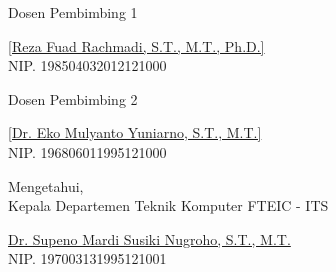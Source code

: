  \begin{center}
  
    \begin{multicols}{2}
  
      Dosen Pembimbing 1
      \vspace{12ex}
  
      \underline{[Reza Fuad Rachmadi, S.T., M.T., Ph.D.]} \\
      NIP. 198504032012121000
  
      \columnbreak
  
      Dosen Pembimbing 2
      \vspace{12ex}
  
      \underline{[Dr. Eko Mulyanto Yuniarno, S.T., M.T.]} \\
      NIP. 196806011995121000
  
    \end{multicols}
    \vspace{6ex}
  
    Mengetahui, \\
    Kepala Departemen Teknik Komputer FTEIC - ITS
    \vspace{12ex}
  
    \underline{Dr. Supeno Mardi Susiki Nugroho, S.T., M.T.} \\
    NIP. 197003131995121001
  
  \end{center}